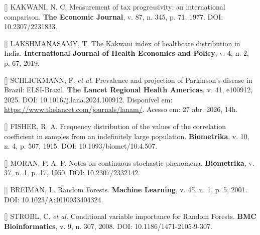 \documentclass[12pt,a4paper,oneside]{article}
\begin{document}
\begin{singlespace}
\noindent\hangindent=1.25cm
[\thebibctr] KAKWANI, N. C. Measurement of tax progressivity: an international
comparison. \textbf{The Economic Journal}, v. 87, n. 345,
p. 71, 1977. DOI: 10.2307/2231833.\label{ref:kakwani}\par\smallskip

\noindent\hangindent=1.25cm
[\thebibctr] LAKSHMANASAMY, T. The Kakwani index of healthcare distribution
in India. \textbf{International Journal of Health Economics and
Policy}, v. 4, n. 2, p. 67,
2019.\label{ref:lakshmanasamy}\par\smallskip

\noindent\hangindent=1.25cm
[\thebibctr] SCHLICKMANN, F. \textit{et al.} Prevalence and projection of
Parkinson's disease in Brazil: ELSI-Brazil. \textbf{The Lancet
Regional Health \textendash{} Americas}, v. 41, e100912, 2025.
DOI: 10.1016/j.lana.2024.100912. Disponível em:
\url{https://www.thelancet.com/journals/lanam/}. Acesso em:
27 abr. 2026, 14h.\label{ref:elsi}\par\smallskip

\noindent\hangindent=1.25cm
[\thebibctr] FISHER, R. A. Frequency distribution of the values of the
correlation coefficient in samples from an indefinitely large
population. \textbf{Biometrika}, v. 10, n. 4, p. 507,
1915. DOI: 10.1093/biomet/10.4.507.\label{ref:fisher}\par\smallskip

\noindent\hangindent=1.25cm
[\thebibctr] MORAN, P. A. P. Notes on continuous stochastic phenomena.
\textbf{Biometrika}, v. 37, n. 1, p. 17,
1950. DOI: 10.2307/2332142.\label{ref:moran-orig}\par\smallskip

\noindent\hangindent=1.25cm
[\thebibctr] BREIMAN, L. Random Forests. \textbf{Machine Learning}, v. 45,
n. 1, p. 5, 2001. DOI:
10.1023/A:1010933404324.\label{ref:breiman}\par\smallskip

\noindent\hangindent=1.25cm
[\thebibctr] STROBL, C. \textit{et al.} Conditional variable importance for
Random Forests. \textbf{BMC Bioinformatics}, v. 9, n. 307, 2008.
DOI: 10.1186/1471-2105-9-307.\label{ref:strobl}\par\smallskip


\end{singlespace}
\end{document}
